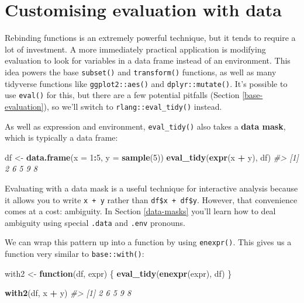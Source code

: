 \documentclass[]{book}
\newenvironment{Shaded}{\begin{snugshade}}{\end{snugshade}}
\newcommand{\CommentTok}[1]{\textcolor[rgb]{0.37,0.37,0.37}{\textit{#1}}}
\newcommand{\ControlFlowTok}[1]{\textcolor[rgb]{0.27,0.27,0.27}{\textbf{#1}}}
\newcommand{\DataTypeTok}[1]{\textcolor[rgb]{0.27,0.27,0.27}{#1}}
\newcommand{\DecValTok}[1]{\textcolor[rgb]{0.06,0.06,0.06}{#1}}
\newcommand{\KeywordTok}[1]{\textcolor[rgb]{0.27,0.27,0.27}{\textbf{#1}}}
\newcommand{\NormalTok}[1]{#1}
\newcommand{\OperatorTok}[1]{\textcolor[rgb]{0.43,0.43,0.43}{\textbf{#1}}}
\newcommand{\StringTok}[1]{\textcolor[rgb]{0.5,0.5,0.5}{#1}}
\begin{document}
\hypertarget{eval-data}{%
\section{Customising evaluation with data}\label{eval-data}}

Rebinding functions is an extremely powerful technique, but it tends to require a lot of investment. A more immediately practical application is modifying evaluation to look for variables in a data frame instead of an environment. This idea powers the base \texttt{subset()} and \texttt{transform()} functions, as well as many tidyverse functions like \texttt{ggplot2::aes()} and \texttt{dplyr::mutate()}. It's possible to use \texttt{eval()} for this, but there are a few potential pitfalls (Section \ref{base-evaluation}), so we'll switch to \texttt{rlang::eval\_tidy()} instead.

As well as expression and environment, \texttt{eval\_tidy()} also takes a \textbf{data mask}, which is typically a data frame:

\begin{Shaded}
\begin{Highlighting}[]
\NormalTok{df <-}\StringTok{ }\KeywordTok{data.frame}\NormalTok{(}\DataTypeTok{x =} \DecValTok{1}\OperatorTok{:}\DecValTok{5}\NormalTok{, }\DataTypeTok{y =} \KeywordTok{sample}\NormalTok{(}\DecValTok{5}\NormalTok{))}
\KeywordTok{eval_tidy}\NormalTok{(}\KeywordTok{expr}\NormalTok{(x }\OperatorTok{+}\StringTok{ }\NormalTok{y), df)}
\CommentTok{#> [1] 2 6 5 9 8}
\end{Highlighting}
\end{Shaded}

Evaluating with a data mask is a useful technique for interactive analysis because it allows you to write \texttt{x\ +\ y} rather than \texttt{df\$x\ +\ df\$y}. However, that convenience comes at a cost: ambiguity. In Section \ref{data-masks} you'll learn how to deal ambiguity using special \texttt{.data} and \texttt{.env} pronouns.

We can wrap this pattern up into a function by using \texttt{enexpr()}. This gives us a function very similar to \texttt{base::with()}:

\begin{Shaded}
\begin{Highlighting}[]
\NormalTok{with2 <-}\StringTok{ }\ControlFlowTok{function}\NormalTok{(df, expr) \{}
  \KeywordTok{eval_tidy}\NormalTok{(}\KeywordTok{enexpr}\NormalTok{(expr), df)}
\NormalTok{\}}

\KeywordTok{with2}\NormalTok{(df, x }\OperatorTok{+}\StringTok{ }\NormalTok{y)}
\CommentTok{#> [1] 2 6 5 9 8}
\end{Highlighting}
\end{Shaded}
\end{document}
